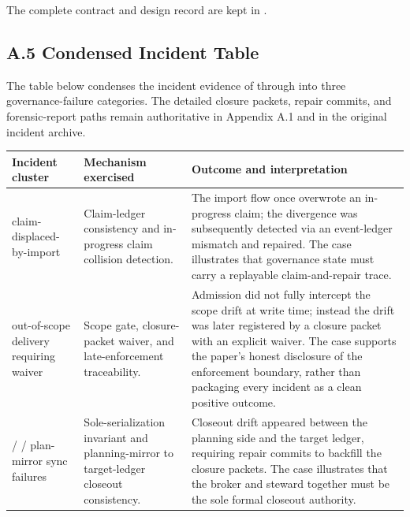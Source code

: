 \documentclass[9pt,letterpaper]{extarticle}
\newcommand{\TableLead}[1]{\par\smallskip\noindent{\raggedright\small\bfseries #1\par}\smallskip}
\begin{document}
The complete contract and design record are kept in \texttt{}.

\subsection*{A.5 Condensed Incident Table}

The table below condenses the incident evidence of \texttt{} through \texttt{} into three governance-failure categories. The detailed closure packets, repair commits, and forensic-report paths remain authoritative in Appendix A.1 and in the original incident archive.

\TableLead{Table A.5 --- Condensed Incident Evidence.}

\begingroup
\tiny
\setlength{\tabcolsep}{2pt}
\begin{longtable}{@{}L{0.22\textwidth}L{0.25\textwidth}L{0.47\textwidth}@{}}
\toprule
Incident cluster & Mechanism exercised & Outcome and interpretation \\
\midrule
\texttt{} claim-displaced-by-import & Claim-ledger consistency and in-progress claim collision detection. & The import flow once overwrote an in-progress claim; the divergence was subsequently detected via an event-ledger mismatch and repaired. The case illustrates that governance state must carry a replayable claim-and-repair trace. \\
\texttt{} out-of-scope delivery requiring waiver & Scope gate, closure-packet waiver, and late-enforcement traceability. & Admission did not fully intercept the scope drift at write time; instead the drift was later registered by a closure packet with an explicit waiver. The case supports the paper's honest disclosure of the enforcement boundary, rather than packaging every incident as a clean positive outcome. \\
\texttt{} / \texttt{} / \texttt{} plan-mirror sync failures & Sole-serialization invariant and planning-mirror to target-ledger closeout consistency. & Closeout drift appeared between the planning side and the target ledger, requiring repair commits to backfill the closure packets. The case illustrates that the broker and steward together must be the sole formal closeout authority. \\
\bottomrule
\end{longtable}
\endgroup
\end{document}
